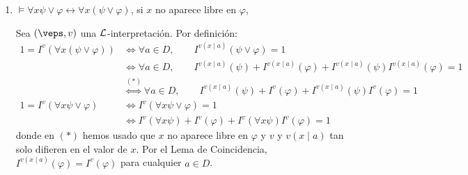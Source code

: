 \begin{ejercicio}
\begin{enumerate}
        Sea $(\veps,v)$ una $\cc{L}$-interpretación. Por definición:
        \begin{align*}
            1 = I^v(\exists x(\psi \wedge \varphi))
            &\iff \exists a\in D,\qquad I^{v(x\mid a)}(\psi \wedge \varphi) = 1\\
            &\iff \exists a\in D,\qquad I^{v(x\mid a)}(\psi)I^{v(x\mid a)}(\varphi) = 1\\
            &\iff \exists a\in D,\qquad I^{v(x\mid a)}(\psi) = 1\text{ y }I^{v(x\mid a)}(\varphi) = 1\\
            &\stackrel{(\ast)}{\iff} \exists a\in D,\qquad I^{v(x\mid a)}(\psi) = 1\text{ y }I^{v}(\varphi) = 1\\
            &\iff I^v(\exists x\psi)=1\text{ y }I^v(\varphi)=1\\
            &\iff I^v(\exists x\psi\wedge\varphi)=1.
        \end{align*}
        donde $(\ast)$ se debe a que $x$ no aparece libre en $\varphi$ y $v$ y $v(x\mid a)$ tan solo difieren en el valor de $x$. Por el Lema de Coincidencia, $I^{v(x\mid a)}(\varphi) = I^v(\varphi)$ para cualquier $a\in D$.
        Por tanto:
        \begin{equation*}
            I^v(\exists x \psi \wedge \varphi) = I^v(\exists x(\psi \wedge \varphi)).
        \end{equation*}

        Por tanto:
        \begin{align*}
            I( \exists x \psi \wedge \varphi \leftrightarrow \exists x(\psi \wedge \varphi))
            &= 1+I(\exists x \psi \wedge \varphi)+I(\exists x(\psi \wedge \varphi))=1
        \end{align*}
        \item $\models \forall x \psi \vee \varphi \leftrightarrow \forall x(\psi \vee \varphi)$, si $x$ no aparece libre en $\varphi$,
        
        Sea $(\veps,v)$ una $\cc{L}$-interpretación. Por definición:
        \begin{align*}
            1 = I^v(\forall x(\psi \vee \varphi))
            &\iff \forall a\in D,\qquad I^{v(x\mid a)}(\psi \vee \varphi) = 1\\
            &\iff \forall a\in D,\qquad I^{v(x\mid a)}(\psi) + I^{v(x\mid a)}(\varphi) + I^{v(x\mid a)}(\psi)I^{v(x\mid a)}(\varphi) = 1\\
            &\stackrel{(\ast)}{\iff} \forall a\in D,\qquad I^{v(x\mid a)}(\psi) + I^{v}(\varphi) + I^{v(x\mid a)}(\psi)I^{v}(\varphi) = 1\\
            1 = I^v(\forall x \psi \vee \varphi)
            &\iff I^v(\forall x \psi \vee \varphi) = 1\\
            &\iff I^v(\forall x \psi) + I^v(\varphi) + I^v(\forall x \psi)I^v(\varphi) = 1
        \end{align*}
        donde en $(\ast)$ hemos usado que $x$ no aparece libre en $\varphi$ y $v$ y $v(x\mid a)$ tan solo difieren en el valor de $x$. Por el Lema de Coincidencia, $I^{v(x\mid a)}(\varphi) = I^v(\varphi)$ para cualquier $a\in D$.


\end{enumerate}
\end{ejercicio}

